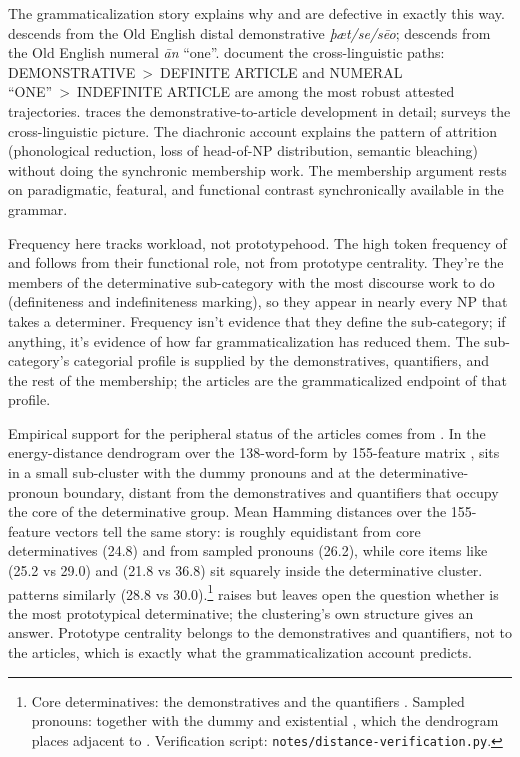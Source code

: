 \documentclass[12pt]{article}
\begin{document}
The grammaticalization story explains why  and  are defective in exactly this way.  descends from the Old English distal demonstrative \textit{þæt/se/sēo};  descends from the Old English numeral \textit{ān} \enquote{one}. \textcite{heinekuteva2002lexicon} document the cross-linguistic paths: DEMONSTRATIVE~>~DEFINITE ARTICLE and NUMERAL \enquote{ONE}~>~INDEFINITE ARTICLE are among the most robust attested trajectories. \textcite{diessel1999} traces the demonstrative-to-article development in detail; \textcite[Ch.~9]{lyons1999} surveys the cross-linguistic picture. The diachronic account explains the pattern of attrition (phonological reduction, loss of head-of-NP distribution, semantic bleaching) without doing the synchronic membership work. The membership argument rests on paradigmatic, featural, and functional contrast synchronically available in the grammar.

Frequency here tracks workload, not prototypehood. The high token frequency of  and  follows from their functional role, not from prototype centrality. They're the members of the determinative sub-category with the most discourse work to do (definiteness and indefiniteness marking), so they appear in nearly every NP that takes a determiner. Frequency isn't evidence that they define the sub-category; if anything, it's evidence of how far grammaticalization has reduced them. The sub-category's categorial profile is supplied by the demonstratives, quantifiers, and the rest of the membership; the articles are the grammaticalized endpoint of that profile.

Empirical support for the peripheral status of the articles comes from \textcite{anon2021dist}. In the energy-distance dendrogram over the 138-word-form by 155-feature matrix \citep{anon2021matrix},  sits in a small sub-cluster with the dummy pronouns  and  at the determinative-pronoun boundary, distant from the demonstratives and quantifiers that occupy the core of the determinative group. Mean Hamming distances over the 155-feature vectors tell the same story:  is roughly equidistant from core determinatives (24.8) and from sampled pronouns (26.2), while core items like  (25.2 vs 29.0) and  (21.8 vs 36.8) sit squarely inside the determinative cluster.  patterns similarly (28.8 vs 30.0).\footnote{Core determinatives: the demonstratives  and the quantifiers . Sampled pronouns:  together with the dummy  and existential , which the dendrogram places adjacent to . Verification script: \texttt{notes/distance-verification.py}.} \textcite{anon2021dist} raises but leaves open the question whether  is the most prototypical determinative; the clustering's own structure gives an answer. Prototype centrality belongs to the demonstratives and quantifiers, not to the articles, which is exactly what the grammaticalization account predicts.
\end{document}
